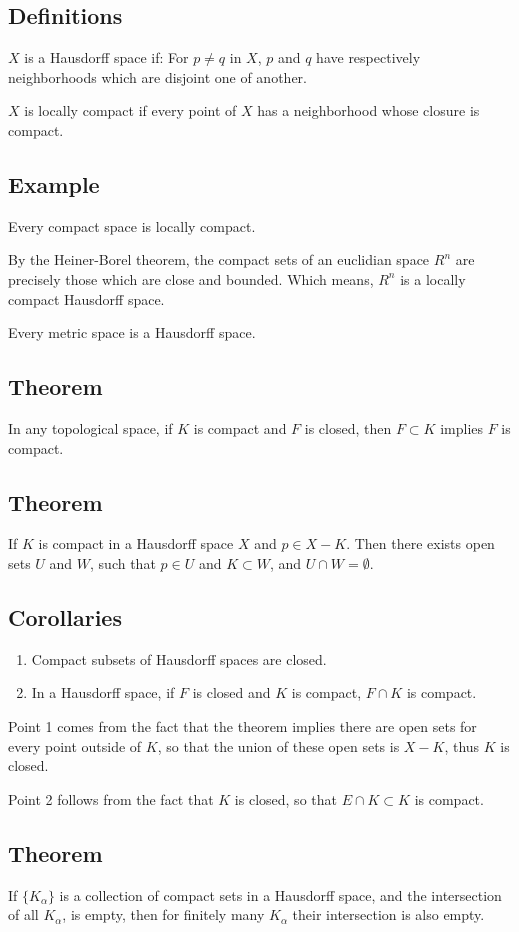 \documentclass[oneside]{book}
\begin{document}
\subsection{Definitions}
$X$ is a Hausdorff space if: For $p\neq q$ in $X$, $p$ and $q$
have respectively neighborhoods which are disjoint one of 
another.

$X$ is locally compact if every point of $X$ has a neighborhood
whose closure is compact.

\subsection*{Example}
Every compact space is locally compact.

By the Heiner-Borel theorem, the compact sets of an
euclidian space $R^n$ are precisely those which are close and
bounded. Which means, $R^n$ is a locally compact Hausdorff space.

Every metric space is a Hausdorff space.

\subsection{Theorem}
In any topological space, if $K$ is compact and $F$ is closed, 
then $F\subset K$ implies $F$ is compact.

\subsection{Theorem}
If $K$ is compact in a Hausdorff space $X$ and $p\in X-K$.
Then there exists open sets $U$ and $W$, such that
$p\in U$ and $K\subset W$, and $U\cap W=\emptyset$.

\subsection*{Corollaries}
\begin{enumerate}
    \item Compact subsets of Hausdorff spaces are closed.
    \item In a Hausdorff space, if $F$ is closed and $K$ is
    compact, $F\cap K$ is compact.
\end{enumerate}
Point 1 comes from the fact that the theorem implies there are
open sets for every point outside of $K$, so that
the union of these open sets is $X-K$, thus $K$ is closed.

Point 2 follows from the fact that $K$ is closed,
so that $E\cap K\subset K$ is compact.

\subsection{Theorem}
If $\{K_\alpha\}$ is a collection of compact sets
in a Hausdorff space, and the intersection of all $K_\alpha$, 
is empty, then for finitely many $K_\alpha$ their intersection
is also empty.
\end{document}
